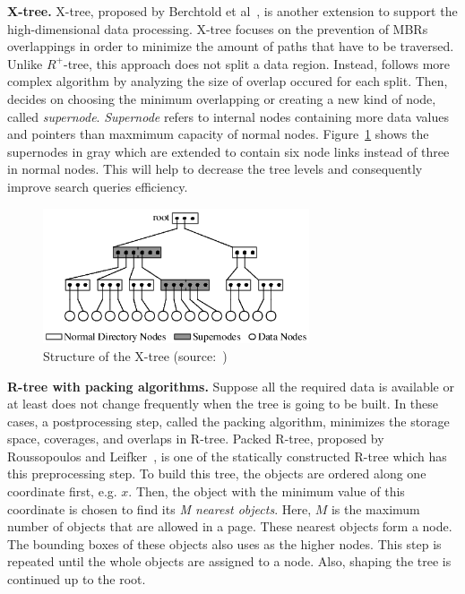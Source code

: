 \documentclass[a4paper,12pt]{article}
\begin{document}
\textbf{X-tree.}
X-tree, proposed by Berchtold et al~\cite{xtree}, is another extension to support the high-dimensional data processing. X-tree focuses on the prevention of MBRs overlappings in order to minimize the amount of paths that have to be traversed. Unlike $R^+$-tree, this approach does not split a data region. Instead, follows more complex algorithm by analyzing the size of overlap occured for each split. Then, decides on choosing the minimum overlapping or creating a new kind of node, called \textit{supernode}. \textit{Supernode} refers to internal nodes containing more data values and pointers than maxmimum capacity of normal nodes. Figure~\ref{figxtree} shows the supernodes in gray which are extended to contain six node links instead of three in normal nodes. This will help to decrease the tree levels and consequently improve search queries efficiency.

\begin{figure}
\centering
\includegraphics[width=0.7\textwidth]{xtree}
\caption{Structure of the X-tree (source:~\cite{xtree})}
\label{figxtree}
\end{figure}


\textbf{R-tree with packing algorithms.}
Suppose all the required data is available or at least does not change frequently when the tree is going to be built.
In these cases, a postprocessing step, called the packing algorithm, minimizes the storage space, coverages, and overlaps in R-tree.
Packed R-tree, proposed by Roussopoulos and Leifker~\cite{packedrtree, packedrtree2}, is one of the statically constructed R-tree which has this preprocessing step. To build this tree, the objects are ordered along one coordinate first, e.g. $x$. Then, the object with the minimum value of this coordinate is chosen to find its \textit{M nearest objects}. Here, $M$ is the maximum number of objects that are allowed in a page. These nearest objects form a node. The bounding boxes of these objects also uses as the higher nodes. This step is repeated until the whole objects are assigned to a node. Also, shaping the tree is continued up to the root.
\end{document}
